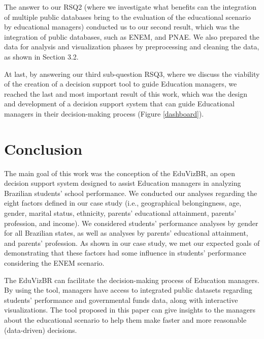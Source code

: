 \documentclass[12pt]{article}
\begin{document}
The answer to our RSQ2 (where we investigate what benefits can the integration of multiple public databases bring to the evaluation of the educational scenario by educational managers) conducted us to our second result, which was the integration of public databases, such as ENEM, and PNAE. We also prepared the data for analysis and visualization phases by preprocessing and cleaning the data, as shown in Section 3.2. 

At last, by answering our third sub-question RSQ3, where we discuss the viability of the creation of a decision support tool to guide Education managers, we reached the last and most important result of this work, which was the design and development of a decision support system that can guide Educational managers in their decision-making process (Figure \ref{dashboard}). 



\section{Conclusion}

The main goal of this work was the conception of the EduVizBR, an open decision support system designed to assist Education managers in analyzing Brazilian students' school performance.
We conducted our analyses regarding the eight factors defined in our case study (i.e., geographical belongingness, age, gender, marital status, ethnicity, parents' educational attainment, parents' profession, and income). We considered students' performance analyses by gender for all Brazilian states, as well as analyses by parents' educational attainment, and parents' profession. As shown in our case study, we met our expected goals of demonstrating that these factors had some influence in students' performance considering the ENEM scenario.

The EduVizBR can facilitate the decision-making process of Education managers. By using the tool, managers have access to integrated public datasets regarding students' performance and governmental funds data, along with interactive visualizations. The tool proposed in this paper can give insights to the managers about the educational scenario to help them make faster and more reasonable (data-driven) decisions.
\end{document}
